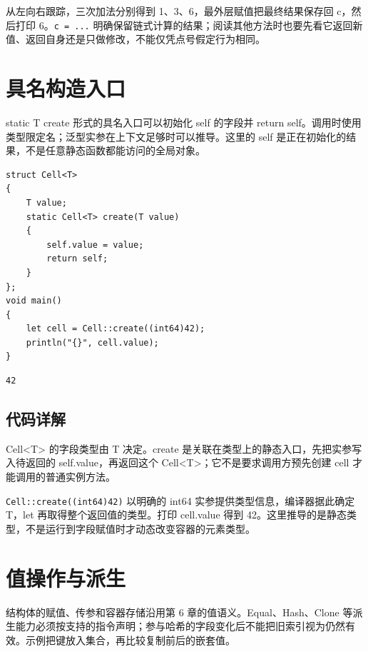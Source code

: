 从左向右跟踪，三次加法分别得到 1、3、6，最外层赋值把最终结果保存回 c，然后打印 6。\texttt{c =\allowbreak{} .\allowbreak{}.\allowbreak{}.\allowbreak{}} 明确保留链式计算的结果；阅读其他方法时也要先看它返回新值、返回自身还是只做修改，不能仅凭点号假定行为相同。

\section{具名构造入口}

static T create 形式的具名入口可以初始化 self 的字段并 return self。调用时使用类型限定名；泛型实参在上下文足够时可以推导。这里的 self 是正在初始化的结果，不是任意静态函数都能访问的全局对象。

\par
\medskip
\begin{lstlisting}[style=chali]
struct Cell<T>
{
    T value;
    static Cell<T> create(T value)
    {
        self.value = value;
        return self;
    }
};
void main()
{
    let cell = Cell::create((int64)42);
    println("{}", cell.value);
}
\end{lstlisting}
\par
\medskip

\par
\medskip
\begin{lstlisting}[style=out]
42
\end{lstlisting}
\par
\medskip

\subsection*{代码详解}

Cell<T> 的字段类型由 T 决定。create 是关联在类型上的静态入口，先把实参写入待返回的 self.value，再返回这个 Cell<T>；它不是要求调用方预先创建 cell 才能调用的普通实例方法。

\texttt{Cell:\allowbreak{}:\allowbreak{}create(\allowbreak{}(\allowbreak{}int64)\allowbreak{}42)\allowbreak{}} 以明确的 int64 实参提供类型信息，编译器据此确定 T，let 再取得整个返回值的类型。打印 cell.value 得到 42。这里推导的是静态类型，不是运行到字段赋值时才动态改变容器的元素类型。

\section{值操作与派生}

结构体的赋值、传参和容器存储沿用第 6 章的值语义。Equal、Hash、Clone 等派生能力必须按支持的指令声明；参与哈希的字段变化后不能把旧索引视为仍然有效。示例把键放入集合，再比较复制前后的嵌套值。

